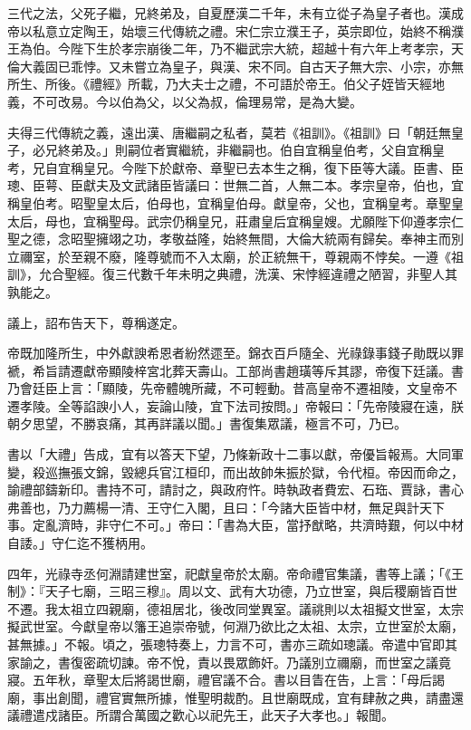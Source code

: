 \begin{pinyinscope}
三代之法，父死子繼，兄終弟及，自夏歷漢二千年，未有立從子為皇子者也。漢成帝以私意立定陶王，始壞三代傳統之禮。宋仁宗立濮王子，英宗即位，始終不稱濮王為伯。今陛下生於孝宗崩後二年，乃不繼武宗大統，超越十有六年上考孝宗，天倫大義固已乖悖。又未嘗立為皇子，與漢、宋不同。自古天子無大宗、小宗，亦無所生、所後。《禮經》所載，乃大夫士之禮，不可語於帝王。伯父子姪皆天經地義，不可改易。今以伯為父，以父為叔，倫理易常，是為大變。

夫得三代傳統之義，遠出漢、唐繼嗣之私者，莫若《祖訓》。《祖訓》曰「朝廷無皇子，必兄終弟及。」則嗣位者實繼統，非繼嗣也。伯自宜稱皇伯考，父自宜稱皇考，兄自宜稱皇兄。今陛下於獻帝、章聖已去本生之稱，復下臣等大議。臣書、臣璁、臣萼、臣獻夫及文武諸臣皆議曰：世無二首，人無二本。孝宗皇帝，伯也，宜稱皇伯考。昭聖皇太后，伯母也，宜稱皇伯母。獻皇帝，父也，宜稱皇考。章聖皇太后，母也，宜稱聖母。武宗仍稱皇兄，莊肅皇后宜稱皇嫂。尤願陛下仰遵孝宗仁聖之德，念昭聖擁翊之功，孝敬益隆，始終無間，大倫大統兩有歸矣。奉神主而別立禰室，於至親不廢，隆尊號而不入太廟，於正統無干，尊親兩不悖矣。一遵《祖訓》，允合聖經。復三代數千年未明之典禮，洗漢、宋悖經違禮之陋習，非聖人其孰能之。

議上，詔布告天下，尊稱遂定。

帝既加隆所生，中外獻諛希恩者紛然遝至。錦衣百戶隨全、光祿錄事錢子勛既以罪褫，希旨請遷獻帝顯陵梓宮北葬天壽山。工部尚書趙璜等斥其謬，帝復下廷議。書乃會廷臣上言：「顯陵，先帝體魄所藏，不可輕動。昔高皇帝不遷祖陵，文皇帝不遷孝陵。全等諂諛小人，妄論山陵，宜下法司按問。」帝報曰：「先帝陵寢在遠，朕朝夕思望，不勝哀痛，其再詳議以聞。」書復集眾議，極言不可，乃已。

書以「大禮」告成，宜有以答天下望，乃條新政十二事以獻，帝優旨報焉。大同軍變，殺巡撫張文錦，毀總兵官江桓印，而出故帥朱振於獄，令代桓。帝因而命之，諭禮部鑄新印。書持不可，請討之，與政府忤。時執政者費宏、石珤、賈詠，書心弗善也，乃力薦楊一清、王守仁入閣，且曰：「今諸大臣皆中材，無足與計天下事。定亂濟時，非守仁不可。」帝曰：「書為大臣，當抒猷略，共濟時艱，何以中材自諉。」守仁迄不獲柄用。

四年，光祿寺丞何淵請建世室，祀獻皇帝於太廟。帝命禮官集議，書等上議；「《王制》：『天子七廟，三昭三穆』。周以文、武有大功德，乃立世室，與后稷廟皆百世不遷。我太祖立四親廟，德祖居北，後改同堂異室。議祧則以太祖擬文世室，太宗擬武世室。今獻皇帝以籓王追崇帝號，何淵乃欲比之太祖、太宗，立世室於太廟，甚無據。」不報。頃之，張璁特奏上，力言不可，書亦三疏如璁議。帝遣中官即其家諭之，書復密疏切諫。帝不悅，責以畏眾飾奸。乃議別立禰廟，而世室之議竟寢。五年秋，章聖太后將謁世廟，禮官議不合。書以目眚在告，上言：「母后謁廟，事出創聞，禮官實無所據，惟聖明裁酌。且世廟既成，宜有肆赦之典，請盡還議禮遣戍諸臣。所謂合萬國之歡心以祀先王，此天子大孝也。」報聞。


\end{pinyinscope}
